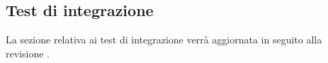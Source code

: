 \subsection{Test di integrazione}

\par La sezione relativa ai test di integrazione verrà aggiornata in seguito alla revisione .